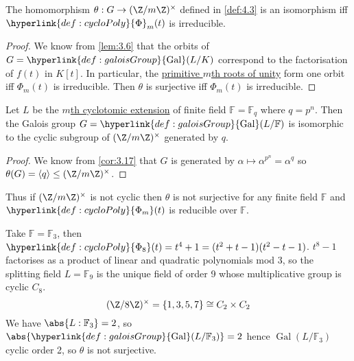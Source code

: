 \documentclass{article}
\DeclareMathOperator{\Gal}{Gal}
\newcommand{\F}{\mathbb{F}}
\begin{document}
\begin{nlemma}\label{lem:4.6}
    The homomorphism $\theta: G \to (\Z/m\Z)^\times$ defined in \cref{def:4.3} is an isomorphism iff $\hyperlink{def:cycloPoly}{\Phi}_m(t)$ is irreducible.
\end{nlemma}

\begin{proof}
    We know from \cref{lem:3.6} that the orbits of $G = \hyperlink{def:galoisGroup}{\Gal}(L/K)$ correspond to the factorisation of $f(t)$ in $K[t]$.
    In particular, the \hyperlink{def:primRoot}{primitive $m$th roots of unity} form one orbit iff $\Phi_m(t)$ is irreducible.
    Then $\theta$ is surjective iff $\Phi_m(t)$ is irreducible.
\end{proof}

\begin{nthm}\label{thm:4.7}
    Let $L$ be the \hyperlink{def:cycloExt}{$m$th cyclotomic extension} of finite field $\F = \F_q$ where $q = p^n$.
    Then the Galois group $G = \hyperlink{def:galoisGroup}{\Gal}(L/\F)$ is isomorphic to the cyclic subgroup of $(\Z/m\Z)^\times$ generated by $q$.
\end{nthm}

\begin{proof}
    We know from \cref{cor:3.17} that $G$ is generated by $\alpha \mapsto \alpha^{p^n} = \alpha^q$ so $\theta(G) = \langle q\rangle \leq (\Z/m\Z)^\times$.
\end{proof}

\begin{remark}
    Thus if $(\Z/m\Z)^\times$ is not cyclic then $\theta$ is not surjective for any finite field $\F$ and $\hyperlink{def:cycloPoly}{\Phi_m}(t)$ is reducible over $\F$.
\end{remark}

\begin{eg}
    Take $\F = \F_3$, then $\hyperlink{def:cycloPoly}{\Phi_8}(t) = t^4 + 1 = (t^2+t-1)(t^2-t-1)$.
    $t^8 - 1$ factorises as a product of linear and quadratic polynomials mod 3, so the splitting field $L = \F_9$ is the unique field of order 9 whose multiplicative group is cyclic $C_8$.
    \begin{equation*}
        (\Z/8\Z)^\times = \{1,3,5,7\}\cong C_2 \times C_2
    \end{equation*}
    We have $\abs{L:\F_3} = 2$, so $\abs{\hyperlink{def:galoisGroup}{\Gal}(L/\F_3)}=2$ hence $\Gal(L/\F_3)$ cyclic order 2, so $\theta$ is not surjective.
\end{eg}
\end{document}
